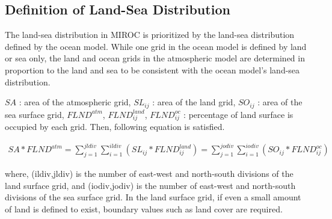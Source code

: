 \hypertarget{definition-of-land-sea-distribution}{%
\subsection{Definition of Land-Sea
Distribution}\label{definition-of-land-sea-distribution}}

The land-sea distribution in MIROC is prioritized by the land-sea
distribution defined by the ocean model. While one grid in the ocean
model is defined by land or sea only, the land and ocean grids in the
atmospheric model are determined in proportion to the land and sea to be
consistent with the ocean model's land-sea distribution.

\(SA\) : area of the atmospheric grid, \(SL _ {ij}\) : area of the land
grid, \(SO _ {ij}\) : area of the sea surface grid, \(FLND^{atm}\),
\(FLND^{land} _ {ij}\), \(FLND^{oc} _ {ij}\) : percentage of land
surface is occupied by each grid. Then, following equation is satisfied.

\begin{eqnarray} SA*FLND^{atm} = \sum _ {j=1}^{jldiv}\sum _ {i=1}^{ildiv}(SL _ {ij}*FLND^{land} _ {ij}) = \sum _ {j=1}^{jodiv}\sum _ {i=1}^{iodiv}(SO _ {ij}*FLND^{oc } _{ij}) \end{eqnarray}

where, (ildiv,jldiv) is the number of east-west and north-south
divisions of the land surface grid, and (iodiv,jodiv) is the number of
east-west and north-south divisions of the sea surface grid. In the land
surface grid, if even a small amount of land is defined to exist,
boundary values such as land cover are required.
